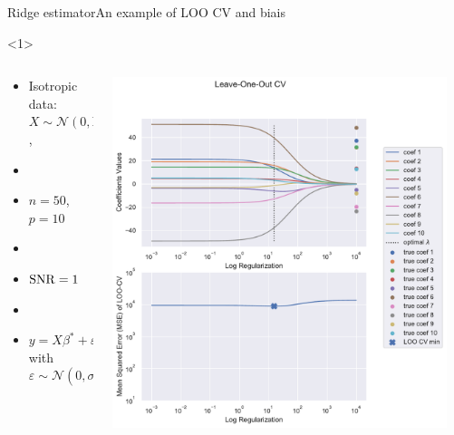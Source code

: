 \documentclass[10pt,aspectratio=43]{beamer}
\begin{document}
\begin{frame}{Ridge estimator}{An example of LOO CV and biais}
    \begin{onlyenv}<1>
        \begin{columns}
            \begin{column}{0.4\textwidth}
                \begin{itemize}
                    \item Isotropic data: $X\sim\mathcal{N}(0,\mathrm{Id})$,
                    \item[]
                    \item $n=50$, $p=10$
                    \item[]
                    \item \textcolor{red}{$\operatorname{SNR}=1$}
                    \item[]
                    \item $y = X\beta^*+\varepsilon$ with $\varepsilon\sim \mathcal{N}(0, \sigma^2\mathrm{Id})$
                \end{itemize}
            \end{column}
            \begin{column}{0.7\textwidth}
                \begin{center}
                        \includegraphics[width=0.95\textwidth]{path_ridge_complete_1_.pdf}

\end{center}
\end{column}
\end{columns}
\end{onlyenv}
\end{frame}
\end{document}

